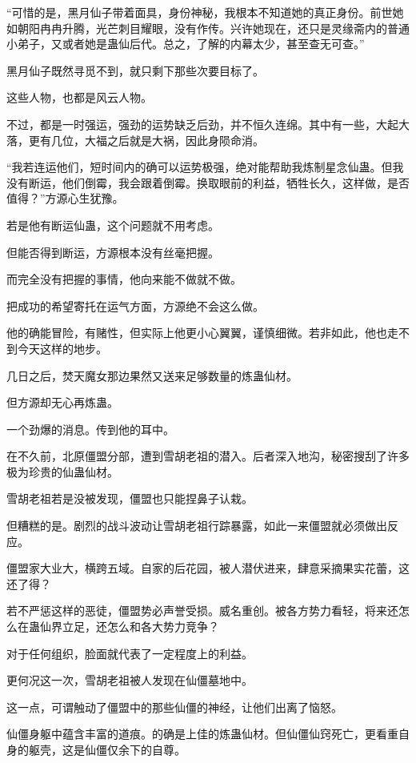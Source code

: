 
\begin{this_body}

“可惜的是，黑月仙子带着面具，身份神秘，我根本不知道她的真正身份。前世她如朝阳冉冉升腾，光芒刺目耀眼，没有作传。兴许她现在，还只是灵缘斋内的普通小弟子，又或者她是蛊仙后代。总之，了解的内幕太少，甚至查无可查。”

黑月仙子既然寻觅不到，就只剩下那些次要目标了。

这些人物，也都是风云人物。

不过，都是一时强运，强劲的运势缺乏后劲，并不恒久连绵。其中有一些，大起大落，更有几位，大福之后就是大祸，因此身陨命消。

“我若连运他们，短时间内的确可以运势极强，绝对能帮助我炼制星念仙蛊。但我没有断运，他们倒霉，我会跟着倒霉。换取眼前的利益，牺牲长久，这样做，是否值得？”方源心生犹豫。

若是他有断运仙蛊，这个问题就不用考虑。

但能否得到断运，方源根本没有丝毫把握。

而完全没有把握的事情，他向来能不做就不做。

把成功的希望寄托在运气方面，方源绝不会这么做。

他的确能冒险，有赌性，但实际上他更小心翼翼，谨慎细微。若非如此，他也走不到今天这样的地步。

几日之后，焚天魔女那边果然又送来足够数量的炼蛊仙材。

但方源却无心再炼蛊。

一个劲爆的消息。传到他的耳中。

在不久前，北原僵盟分部，遭到雪胡老祖的潜入。后者深入地沟，秘密搜刮了许多极为珍贵的仙蛊仙材。

雪胡老祖若是没被发现，僵盟也只能捏鼻子认栽。

但糟糕的是。剧烈的战斗波动让雪胡老祖行踪暴露，如此一来僵盟就必须做出反应。

僵盟家大业大，横跨五域。自家的后花园，被人潜伏进来，肆意采摘果实花蕾，这还了得？

若不严惩这样的恶徒，僵盟势必声誉受损。威名重创。被各方势力看轻，将来还怎么在蛊仙界立足，还怎么和各大势力竞争？

对于任何组织，脸面就代表了一定程度上的利益。

更何况这一次，雪胡老祖被人发现在仙僵墓地中。

这一点，可谓触动了僵盟中的那些仙僵的神经，让他们出离了恼怒。

仙僵身躯中蕴含丰富的道痕。的确是上佳的炼蛊仙材。但仙僵仙窍死亡，更看重自身的躯壳，这是仙僵仅余下的自尊。


\end{this_body}
